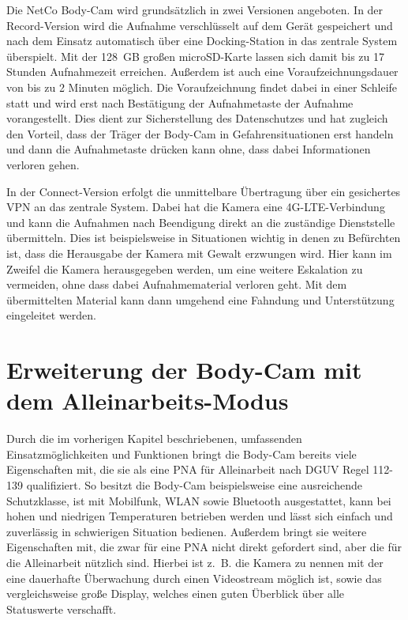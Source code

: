 \documentclass[thesis.tex]{subfiles}
\begin{document}
Die NetCo Body-Cam wird grundsätzlich in zwei Versionen angeboten.
In der Record-Version wird die Aufnahme verschlüsselt auf dem Gerät gespeichert und nach dem Einsatz automatisch über eine Docking-Station in das zentrale System überspielt.
Mit der 128~GB großen microSD-Karte lassen sich damit bis zu 17 Stunden Aufnahmezeit erreichen.
Außerdem ist auch eine Voraufzeichnungsdauer von bis zu 2 Minuten möglich.
Die Voraufzeichnung findet dabei in einer Schleife statt und wird erst nach Bestätigung der Aufnahmetaste der Aufnahme vorangestellt.
Dies dient zur Sicherstellung des Datenschutzes und hat zugleich den Vorteil, dass der Träger der Body-Cam in Gefahrensituationen erst handeln und dann die Aufnahmetaste drücken kann ohne, dass dabei Informationen verloren gehen.

In der Connect-Version erfolgt die unmittelbare Übertragung über ein gesichertes VPN an das zentrale System.
Dabei hat die Kamera eine 4G-LTE-Verbindung und kann die Aufnahmen nach Beendigung direkt an die zuständige Dienststelle übermitteln.
Dies ist beispielsweise in Situationen wichtig in denen zu Befürchten ist, dass die Herausgabe der Kamera mit Gewalt erzwungen wird.
Hier kann im Zweifel die Kamera herausgegeben werden, um eine weitere Eskalation zu vermeiden, ohne dass dabei Aufnahmematerial verloren geht.
Mit dem übermittelten Material kann dann umgehend eine Fahndung und Unterstützung eingeleitet werden.

\section{Erweiterung der Body-Cam mit dem Alleinarbeits-Modus}

Durch die im vorherigen Kapitel beschriebenen, umfassenden Einsatzmöglichkeiten und Funktionen bringt die Body-Cam bereits viele Eigenschaften mit, die sie als eine PNA für Alleinarbeit nach DGUV Regel 112-139 \cite[][]{Regel_112-139} qualifiziert.
So besitzt die Body-Cam beispielsweise eine ausreichende Schutzklasse, ist mit Mobilfunk, WLAN sowie Bluetooth ausgestattet, kann bei hohen und niedrigen Temperaturen betrieben werden und lässt sich einfach und zuverlässig in schwierigen Situation bedienen.
Außerdem bringt sie weitere Eigenschaften mit, die zwar für eine PNA nicht direkt gefordert sind, aber die für die Alleinarbeit nützlich sind.
Hierbei ist z.~B. die Kamera zu nennen mit der eine dauerhafte Überwachung durch einen Videostream möglich ist, sowie das vergleichsweise große Display, welches einen guten Überblick über alle Statuswerte verschafft.
\end{document}
